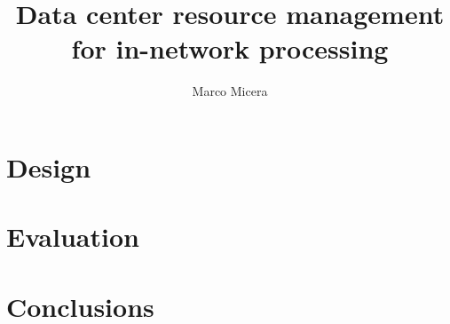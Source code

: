

\title{Data center resource management for in-network processing}
\date{} %
\author{Marco Micera}



\maketitle




% 


\section{Design}


\section{Evaluation}


\section{Conclusions}





